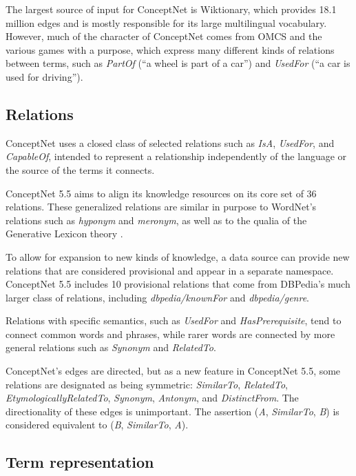 \documentclass[letterpaper]{article}
\begin{document}
The largest source of input for ConceptNet is Wiktionary, which provides
18.1 million edges and is mostly responsible for its large multilingual
vocabulary. However, much of the character of ConceptNet comes from OMCS
and the various games with a purpose, which express many different kinds
of relations between terms, such as \emph{PartOf} (``a wheel is part of
a car'') and \emph{UsedFor} (``a car is used for driving'').


\subsection{Relations}\label{relations}

ConceptNet uses a closed class of selected relations such as \emph{IsA},
\emph{UsedFor}, and \emph{CapableOf}, intended to
represent a relationship independently of the language or the source of
the terms it connects.

ConceptNet 5.5 aims to align its knowledge resources on its core set of 36
relations. These generalized relations are similar in purpose to WordNet's
relations such as \emph{hyponym} and \emph{meronym}, as well as to the qualia
of the Generative Lexicon theory \cite{pustejovsky1991generative}.

To allow for expansion to new kinds of knowledge, a data
source can provide new relations that are considered provisional and
appear in a separate namespace. ConceptNet 5.5 includes 10 provisional
relations that come from DBPedia's much larger class of relations,
including \emph{dbpedia/knownFor} and \emph{dbpedia/genre}.

Relations with specific semantics, such as \emph{UsedFor} and
\emph{HasPrerequisite}, tend to connect common words and phrases, while
rarer words are connected by more general relations such as
\emph{Synonym} and \emph{RelatedTo}.

ConceptNet's edges are directed, but as a new feature in ConceptNet 5.5,
some relations are designated as being symmetric: \emph{SimilarTo},
\emph{RelatedTo}, \emph{EtymologicallyRelatedTo}, \emph{Synonym},
\emph{Antonym}, and \emph{DistinctFrom}. The directionality of these
edges is unimportant. The assertion (\emph{A}, \emph{SimilarTo},
\emph{B}) is considered equivalent to (\emph{B}, \emph{SimilarTo},
\emph{A}).


\subsection{Term representation}\label{term-representation}
\end{document}
